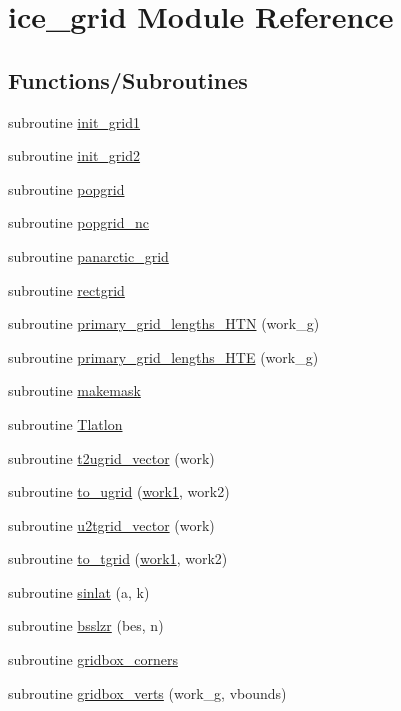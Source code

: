 \hypertarget{namespaceice__grid}{
\section{ice\_\-grid Module Reference}
\label{namespaceice__grid}
}
\subsection*{Functions/Subroutines}
\begin{DoxyCompactItemize}
\item 
subroutine \hyperlink{namespaceice__grid_ace97d5a2cdb55b3e8caa37f125635f14}{init\_\-grid1}
\item 
subroutine \hyperlink{namespaceice__grid_a1443c2d00f599d16be96edeb376c3e97}{init\_\-grid2}
\item 
subroutine \hyperlink{namespaceice__grid_a24e5c873e7aef7bffaa80de04d205f1c}{popgrid}
\item 
subroutine \hyperlink{namespaceice__grid_a830c0e85f52a27b04394190410c74730}{popgrid\_\-nc}
\item 
subroutine \hyperlink{namespaceice__grid_ae6e42c3f57ad49e30c85c71573096781}{panarctic\_\-grid}
\item 
subroutine \hyperlink{namespaceice__grid_a2368fc9f9adb4dd4c869e9e618923640}{rectgrid}
\item 
subroutine \hyperlink{namespaceice__grid_a2eadb37992f11dff1d497737f391f976}{primary\_\-grid\_\-lengths\_\-HTN} (work\_\-g)
\item 
subroutine \hyperlink{namespaceice__grid_a101630e53001c3cf050c5c5672199c25}{primary\_\-grid\_\-lengths\_\-HTE} (work\_\-g)
\item 
subroutine \hyperlink{namespaceice__grid_a3b4d1b3eb2836fed2bf8389411d1dbf0}{makemask}
\item 
subroutine \hyperlink{namespaceice__grid_a6d381958e459356fe9b135a76d3423e4}{Tlatlon}
\item 
subroutine \hyperlink{namespaceice__grid_afcc1556abeece73115e27355f13c1f66}{t2ugrid\_\-vector} (work)
\item 
subroutine \hyperlink{namespaceice__grid_af263876d35043749020fcd9c12766b3f}{to\_\-ugrid} (\hyperlink{namespaceice__grid_a77ce4807a6b38d81367a3a7d67e2aa7c}{work1}, work2)
\item 
subroutine \hyperlink{namespaceice__grid_aefb15c768a63706ec6a5155d55b6c5a9}{u2tgrid\_\-vector} (work)
\item 
subroutine \hyperlink{namespaceice__grid_a63f5a2363aeb189e80ffb2294d20c42b}{to\_\-tgrid} (\hyperlink{namespaceice__grid_a77ce4807a6b38d81367a3a7d67e2aa7c}{work1}, work2)
\item 
subroutine \hyperlink{namespaceice__grid_ac06419b8058ea2a7164cf726ac07b544}{sinlat} (a, k)
\item 
subroutine \hyperlink{namespaceice__grid_a26e7cc8fc629dd16d1f98839ebb9b5ff}{bsslzr} (bes, n)
\item 
subroutine \hyperlink{namespaceice__grid_a5cd4fd8007e449d3daca8a8ddd45b1b0}{gridbox\_\-corners}
\item 
subroutine \hyperlink{namespaceice__grid_acfca25b6f395314aa5ccacde317d5bac}{gridbox\_\-verts} (work\_\-g, vbounds)
\end{DoxyCompactItemize}
